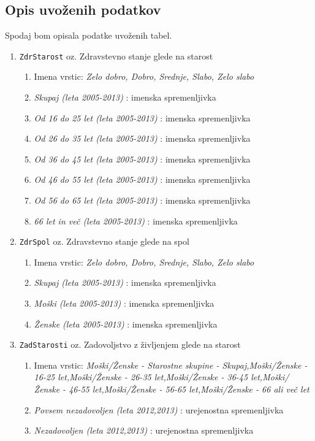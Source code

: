 \documentclass[11pt,a4paper]{article}
\begin{document}
\subsection{Opis uvoženih podatkov}
Spodaj bom opisala podatke uvoženih tabel.
\begin{enumerate}
\item \verb+ZdrStarost+ oz. Zdravstevno stanje glede na starost
\begin{enumerate}
\item Imena vrstic: \textit{Zelo dobro, Dobro, Srednje, Slabo, Zelo slabo}
\item \textit{Skupaj (leta 2005-2013)} : imenska spremenljivka
\item \textit{Od 16 do 25 let (leta 2005-2013)} : imenska spremenljivka
\item \textit{Od 26 do 35 let (leta 2005-2013)} : imenska spremenljivka
\item \textit{Od 36 do 45 let (leta 2005-2013)} : imenska spremenljivka
\item \textit{Od 46 do 55 let (leta 2005-2013)} : imenska spremenljivka
\item \textit{Od 56 do 65 let (leta 2005-2013)} : imenska spremenljivka
\item \textit{66 let in več (leta 2005-2013)} : imenska spremenljivka
\end{enumerate}
\item \verb+ZdrSpol+ oz. Zdravstevno stanje glede na spol
\begin{enumerate}
\item Imena vrstic: \textit{Zelo dobro, Dobro, Srednje, Slabo, Zelo slabo}
\item \textit{Skupaj (leta 2005-2013)} : imenska spremenljivka
\item \textit{Moški (leta 2005-2013)} : imenska spremenljivka
\item \textit{Ženske (leta 2005-2013)} : imenska spremenljivka
\end{enumerate}
\item \verb+ZadStarosti+ oz. Zadovoljstvo z življenjem glede na starost
\begin{enumerate}
\item Imena vrstic: \textit{Moški/Ženske - Starostne skupine - Skupaj,Moški/Ženske - 16-25 let,Moški/Ženske - 26-35 let,Moški/Ženske - 36-45 let,Moški/Ženske - 46-55 let,Moški/Ženske - 56-65 let,Moški/Ženske - 66 ali več let}
\item \textit{Povsem nezadovoljen (leta 2012,2013)} : urejenostna spremenljivka
\item \textit{Nezadovoljen (leta 2012,2013)} : urejenostna spremenljivka

\end{enumerate}
\end{enumerate}
\end{document}
